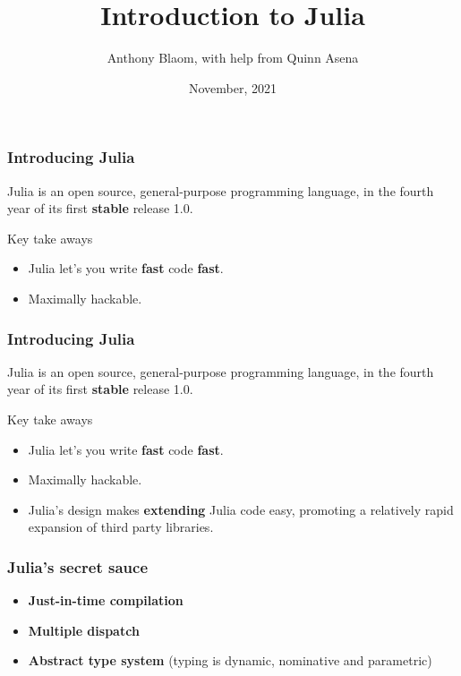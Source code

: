 \documentclass[t]{beamer}
\title{\color{Maroon} Introduction to Julia}
\date{November, 2021}
\author{Anthony Blaom, with help from Quinn Asena}
\newcommand\df{\bf\color{Maroon}}
\begin{document}



\begin{frame}
        \titlepage
\end{frame}

\begin{frame}
  \frametitle{Introducing Julia}
  Julia is an open source, general-purpose programming language, in
  the fourth year of its first {\df stable} release 1.0.\pause

  \begin{block}{Key take aways}
    \begin{itemize}
    \item Julia let's you write {\df fast}
      code {\df fast}.\pause
    \item Maximally hackable.
  \end{itemize}
  \end{block}
\end{frame}




\begin{frame}
  \frametitle{Introducing Julia}
  Julia is an open source, general-purpose programming language, in
  the fourth year of its first {\df stable} release 1.0.

  \begin{block}{Key take aways}
    \begin{itemize}
    \item Julia let's you write {\df fast}
      code {\df fast}.
    \item Maximally hackable.
    \item Julia's design makes {\df extending} Julia code easy,
      promoting a relatively rapid expansion of third party libraries.
    \end{itemize}
  \end{block}
\end{frame}

\begin{frame}
  \frametitle{Julia's secret sauce}
    \begin{itemize}
    \item {\df Just-in-time compilation}
    \item {\df Multiple dispatch}
    \item {\df Abstract type system} (typing is dynamic, nominative and parametric)
  \end{itemize}
\end{frame}
\end{document}
